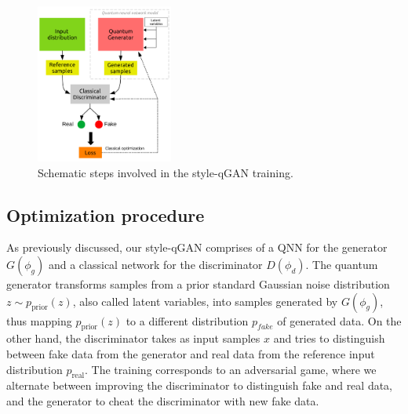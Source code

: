 \documentclass[twocolumn,preprintnumbers,superscriptaddress]{revtex4-2}
\begin{document}
\begin{figure}
  \includegraphics[width=0.4\textwidth]{plots/scheme2.pdf}
  \caption{\label{fig:scheme} Schematic steps involved in the style-qGAN training.}
\end{figure}

\subsection{Optimization procedure}

As previously discussed, our style-qGAN comprises of a QNN for the generator $G(\phi_g)$ and a classical network for the discriminator $D(\phi_d)$. The quantum generator transforms samples from a prior standard Gaussian noise distribution $z \sim p_{\mathrm{prior}}(z)$, also called latent variables, into samples generated by $G(\phi_g)$, thus mapping $p_{\mathrm{prior}}(z)$ to a different distribution $p_{fake}$ of generated data. On the other hand, the discriminator takes as input samples $x$ and tries to distinguish between fake data from the generator and real data from the reference input distribution $p_{\mathrm{real}}$. The training corresponds to an adversarial game, where we alternate between improving the discriminator to distinguish fake and real data, and the generator to cheat the discriminator with new fake data.
\end{document}
